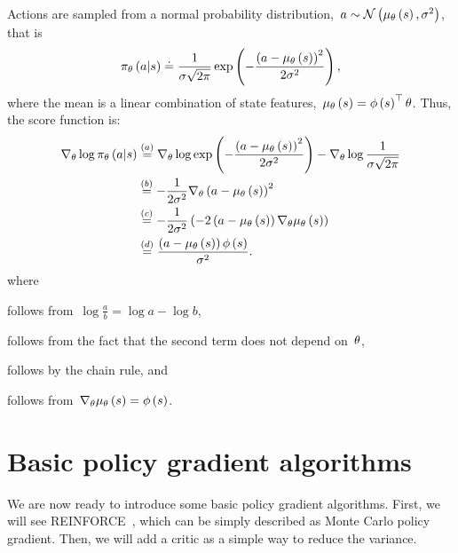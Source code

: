 Actions are sampled from a normal probability distribution,~${\action\sim\mathcal{N}\left(\mu_{\policyparameter}\left(\state\right),\sigma^{2}\right)}$, that is
\begin{equation}
	\policy_{\policyparameter}\left(\action\middle\vert\state\right)\doteq\frac{1}{\sigma\sqrt{2\pi}}\exp\left(-\frac{\left(\action-\mu_{\policyparameter}\left(\state\right)\right)^{2}}{2\sigma^{2}}\right),
\end{equation}
where the mean is a linear combination of state features,~${\mu_{\policyparameter}\left(\state\right)=\featurevector\left(\state\right)^{\top}\policyparameter}$. Thus, the score function is:
\begin{align}
	\nabla_{\policyparameter}\log\policy_{\policyparameter}\left(\action\middle\vert\state\right)
		&\overset{(a)}{=}\nabla_{\policyparameter}\log\exp\left(-\frac{\left(\action-\mu_{\policyparameter}\left(\state\right)\right)^{2}}{2\sigma^{2}}\right)-\nabla_{\policyparameter}\log\frac{1}{\sigma\sqrt{2\pi}} \notag \\
		&\overset{(b)}{=}-\frac{1}{2\sigma^{2}}\nabla_{\policyparameter}\left(\action-\mu_{\policyparameter}\left(\state\right)\right)^{2} \notag \\
		&\overset{(c)}{=}-\frac{1}{2\sigma^{2}}\left(-2\left(\action-\mu_{\policyparameter}\left(\state\right)\right)\nabla_{\policyparameter}\mu_{\policyparameter}\left(\state\right)\right) \notag \\
		&\overset{(d)}{=}\frac{\left(\action-\mu_{\policyparameter}\left(\state\right)\right)\featurevector\left(\state\right)}{\sigma^2}.
\end{align}
where
\begin{enumerate*}[label=(\alph*)]
	\item follows from~${\log\frac{a}{b}=\log{a}-\log{b}}$,
	\item follows from the fact that the second term does not depend on~${\theta}$,
	\item follows by the chain rule, and
	\item follows from~${\nabla_{\policyparameter}\mu_{\policyparameter}\left(\state\right)=\featurevector\left(\state\right)}$.
\end{enumerate*}

\section{Basic policy gradient algorithms}
We are now ready to introduce some basic policy gradient algorithms. First, we will see REINFORCE~\cite{williams1992reinforce}, which can be simply described as Monte Carlo policy gradient. Then, we will add a critic as a simple way to reduce the variance.

